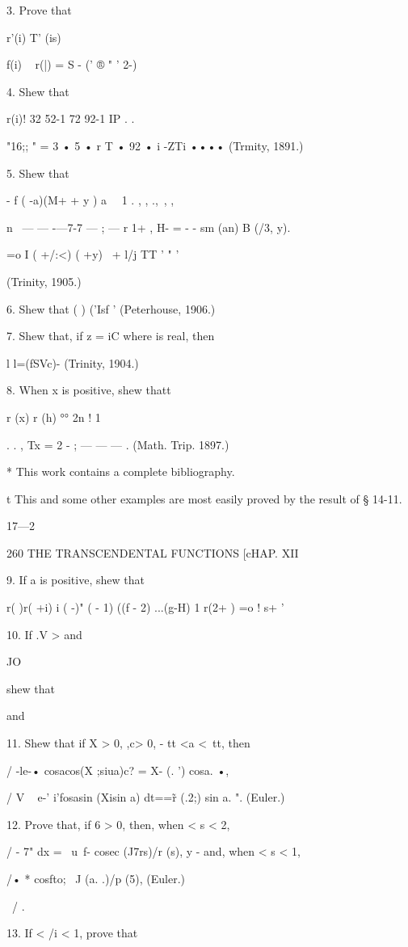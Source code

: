 3. Prove that

r'(i) T' (is)

f(i) ~ r(|) = S - (' ® " ' 2-)

4. Shew that

 r(i)! 32 52-1 72 92-1 IP . .

"16;; " = 3 • 5 • r T • 92 • i -ZTi •••• (Trmity, 1891.)

5. Shew that

- f ( -a)(M+ + y ) a \ \ 1 . , , .,\ , ,

n \ — — -—7-7 — ; — r 1+ , H- = - - sm (an) B (/3, y).

 =o I ( +/:<) ( +y) \ + l/j TT ' " '

(Trinity, 1905.)

6. Shew that ( ) ('Isf ' (Peterhouse, 1906.)

7. Shew that, if z = iC where is real, then

l l=\/(fSVc)- (Trinity, 1904.)

8. When x is positive, shew thatt

r (x) r (h) °° 2n ! 1

 . . , Tx = 2 - ; — — — . (Math. Trip. 1897.)

* This work contains a complete bibliography.

t This and some other examples are most easily proved by the result of
§ 14-11.

17—2

260 THE TRANSCENDENTAL FUNCTIONS [cHAP. XII

9. If a is positive, shew that

r( )r( +i) i ( -)" ( - 1) ((f - 2) ...(g-H) 1 r(2+ ) =o ! s+ '

10. If .V > and

JO

shew that

and

11. Shew that if X > 0, ,c> 0, - tt <a <\ tt, then

/ -le-• cosacos(X ;siua)c? = X- (. ') cosa. •,

/ V ~ e-' i'fosasin (Xisin a) dt==\~ r (.2;) sin a. ". (Euler.)

12. Prove that, if 6 > 0, then, when < s < 2,

/ - 7" dx = \ u\ f- cosec (J7rs)/r (s), y - and, when < s < 1,

/• * cosfto; \ J (a. .)/p (5), (Euler.)

\ / .

13. If < /i < 1, prove that

